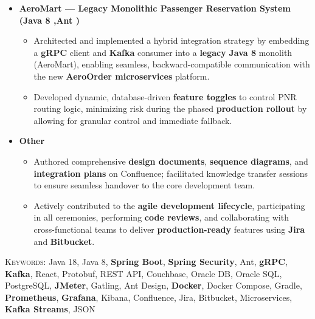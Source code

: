 \begin{itemize}[leftmargin=*, itemsep=0.3em, topsep=0.01em]
    \item \textbf{AeroMart — Legacy Monolithic Passenger Reservation System (Java 8 ,Ant )}
    \begin{itemize}[leftmargin=1.5em, itemsep=0.2em, topsep=0.1em]
        \item Architected and implemented a hybrid integration strategy by embedding a \textbf{gRPC} client and \textbf{Kafka} consumer into a \textbf{legacy} \textbf{Java 8} monolith (AeroMart), enabling seamless, backward-compatible communication with the new \textbf{AeroOrder microservices} platform.
        \item Developed dynamic, database-driven \textbf{feature toggles} to control PNR routing logic, minimizing risk during the phased \textbf{production rollout} by allowing for granular control and immediate fallback.
    \end{itemize}

    \item \textbf{Other}
    \begin{itemize}[leftmargin=1.5em, itemsep=0.2em, topsep=0.1em]
        \item Authored comprehensive \textbf{design documents}, \textbf{sequence diagrams}, and \textbf{integration plans} on Confluence; facilitated knowledge transfer sessions to ensure seamless handover to the core development team.
        \item Actively contributed to the \textbf{agile development lifecycle}, participating in all ceremonies, performing \textbf{code reviews}, and collaborating with cross-functional teams to deliver \textbf{production-ready} features using \textbf{Jira} and \textbf{Bitbucket}.
    \end{itemize}

\end{itemize}

\vspace{-0.1em}
\noindent\small
\textsc{Keywords:} %
Java 18, Java 8, \textbf{Spring Boot}, \textbf{Spring Security}, Ant, \textbf{gRPC}, \textbf{Kafka}, React, Protobuf, REST API, Couchbase, Oracle DB, Oracle SQL, PostgreSQL, \textbf{JMeter}, Gatling, Ant Design, \textbf{Docker}, Docker Compose, Gradle, \textbf{Prometheus}, \textbf{Grafana}, Kibana, Confluence, Jira, Bitbucket, Microservices, \textbf{Kafka Streams}, JSON
\normalsize
